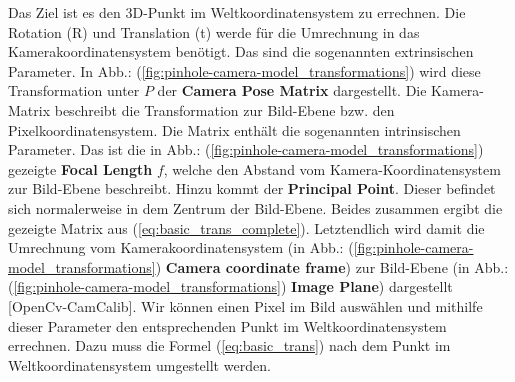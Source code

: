 		Das Ziel ist es den 3D-Punkt im Weltkoordinatensystem zu errechnen. Die Rotation (R) und Translation (t) werde für die Umrechnung in das Kamerakoordinatensystem benötigt. Das sind die sogenannten extrinsischen Parameter. In Abb.: (\ref{fig:pinhole-camera-model_transformations}) wird diese Transformation unter \( P \) der \textbf{Camera Pose Matrix} dargestellt. \newline
		Die Kamera-Matrix beschreibt die Transformation zur Bild-Ebene bzw. den Pixelkoordinatensystem. Die Matrix enthält die sogenannten intrinsischen Parameter. Das ist die in Abb.: (\ref{fig:pinhole-camera-model_transformations}) gezeigte \textbf{Focal Length} \( f \), welche den Abstand vom Kamera-Koordinatensystem zur Bild-Ebene beschreibt. Hinzu kommt der \textbf{Principal Point}. Dieser befindet sich normalerweise in dem Zentrum der Bild-Ebene. Beides zusammen ergibt die gezeigte Matrix aus (\ref{eq:basic_trans_complete}). Letztendlich wird damit die Umrechnung vom Kamerakoordinatensystem (in Abb.: (\ref{fig:pinhole-camera-model_transformations}) \textbf{Camera coordinate frame}) zur Bild-Ebene (in Abb.: (\ref{fig:pinhole-camera-model_transformations}) \textbf{Image Plane}) dargestellt [OpenCv-CamCalib]. \newline 
		Wir können einen Pixel im Bild auswählen und mithilfe dieser Parameter den entsprechenden Punkt im Weltkoordinatensystem errechnen. Dazu muss die Formel (\ref{eq:basic_trans}) nach dem Punkt im Weltkoordinatensystem umgestellt werden.
		
